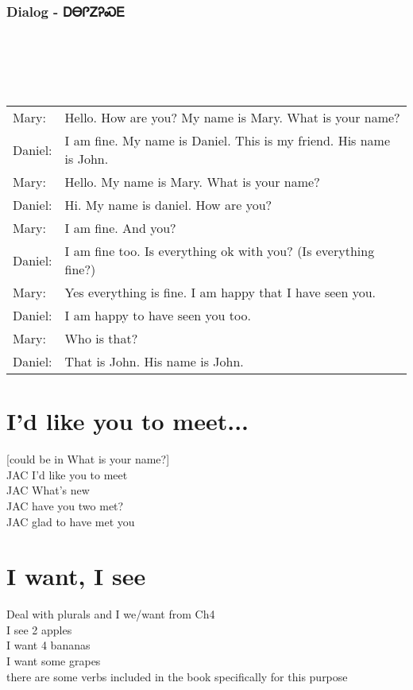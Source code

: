 \newpage\subsection{Dialog - ᎠᎾᎵᏃᎮᏍᎬ}
\begin{tabular}{p{2cm} p{11cm}}
\end{tabular}
\\
\\
\\
\noindent\begin{tabular}{p{2cm} p{11cm}}Mary: & Hello.  How are you?  My name is Mary.  What is your name?\\
Daniel: & I am fine.  My name is Daniel.  This is my friend.  His name is John.\\
Mary: & Hello.  My name is Mary.  What is your name?\\
Daniel: & Hi.  My name is daniel.  How are you?\\
Mary: & I am fine.  And you?\\
Daniel: & I am fine too.  Is everything ok with you? (Is everything fine?)\\
Mary: & Yes everything is fine.  I am happy that I have seen you.\\
Daniel: & I am happy to have seen you too.\\
Mary: & Who is that?\\
Daniel: & That is John.  His name is John.\\
\end{tabular}
\vfill\newpage{}
\chapter*{I'd like you to meet...}
[could be in What is your name?]\\
JAC I'd like you to meet\\
JAC What's new\\
JAC have you two met?\\
JAC glad to have met you\\
\chapter*{I want, I see}
Deal with plurals and I we/want from Ch4\\
I see 2 apples\\
I want 4 bananas\\
I want some grapes\\
there are some verbs included in the book specifically for this purpose\\
\index{}
